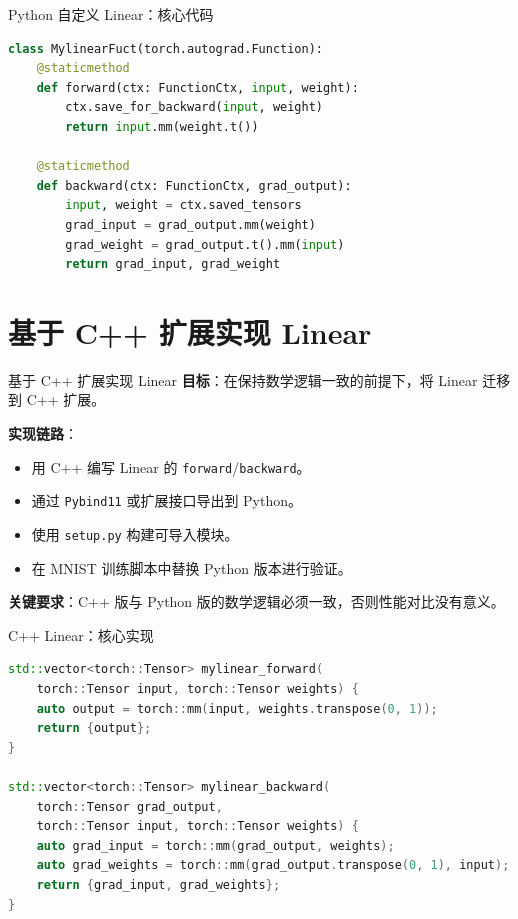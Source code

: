 \documentclass[10pt, aspectratio=169]{beamer}
\begin{document}
\begin{frame}[fragile]{Python 自定义 Linear：核心代码}
    \begin{lstlisting}[language=Python]
class MylinearFuct(torch.autograd.Function):
    @staticmethod
    def forward(ctx: FunctionCtx, input, weight):
        ctx.save_for_backward(input, weight)
        return input.mm(weight.t())

    @staticmethod
    def backward(ctx: FunctionCtx, grad_output):
        input, weight = ctx.saved_tensors
        grad_input = grad_output.mm(weight)
        grad_weight = grad_output.t().mm(input)
        return grad_input, grad_weight
    \end{lstlisting}
\end{frame}

\section{基于 C++ 扩展实现 Linear}

\begin{frame}{基于 C++ 扩展实现 Linear}
    \textbf{目标}：在保持数学逻辑一致的前提下，将 Linear 迁移到 C++ 扩展。
    \vspace{0.2cm}

    \textbf{实现链路}：
    \begin{itemize}
        \item 用 C++ 编写 Linear 的 \texttt{forward}/\texttt{backward}。
        \item 通过 \texttt{Pybind11} 或扩展接口导出到 Python。
        \item 使用 \texttt{setup.py} 构建可导入模块。
        \item 在 MNIST 训练脚本中替换 Python 版本进行验证。
    \end{itemize}

    \vspace{0.2cm}
    \textbf{关键要求}：C++ 版与 Python 版的数学逻辑必须一致，否则性能对比没有意义。
\end{frame}

\begin{frame}[fragile]{C++ Linear：核心实现}
    \begin{lstlisting}[language=C++]
std::vector<torch::Tensor> mylinear_forward(
    torch::Tensor input, torch::Tensor weights) {
    auto output = torch::mm(input, weights.transpose(0, 1));
    return {output};
}

std::vector<torch::Tensor> mylinear_backward(
    torch::Tensor grad_output,
    torch::Tensor input, torch::Tensor weights) {
    auto grad_input = torch::mm(grad_output, weights);
    auto grad_weights = torch::mm(grad_output.transpose(0, 1), input);
    return {grad_input, grad_weights};
}
    \end{lstlisting}
\end{frame}
\end{document}

